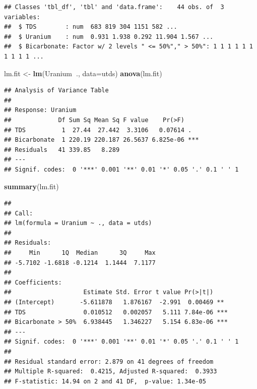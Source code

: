 \documentclass[]{book}
\newenvironment{Shaded}{\begin{snugshade}}{\end{snugshade}}
\newcommand{\CommentTok}[1]{\textcolor[rgb]{0.56,0.35,0.01}{\textit{#1}}}
\newcommand{\DataTypeTok}[1]{\textcolor[rgb]{0.13,0.29,0.53}{#1}}
\newcommand{\DecValTok}[1]{\textcolor[rgb]{0.00,0.00,0.81}{#1}}
\newcommand{\KeywordTok}[1]{\textcolor[rgb]{0.13,0.29,0.53}{\textbf{#1}}}
\newcommand{\NormalTok}[1]{#1}
\newcommand{\OperatorTok}[1]{\textcolor[rgb]{0.81,0.36,0.00}{\textbf{#1}}}
\newcommand{\StringTok}[1]{\textcolor[rgb]{0.31,0.60,0.02}{#1}}
\theoremstyle{definition}
\theoremstyle{definition}
\theoremstyle{definition}
\theoremstyle{remark}
\begin{document}
\begin{Shaded}
\end{Shaded}

\begin{verbatim}
## Classes 'tbl_df', 'tbl' and 'data.frame':    44 obs. of  3 variables:
##  $ TDS        : num  683 819 304 1151 582 ...
##  $ Uranium    : num  0.931 1.938 0.292 11.904 1.567 ...
##  $ Bicarbonate: Factor w/ 2 levels " <= 50%"," > 50%": 1 1 1 1 1 1 1 1 1 1 ...
\end{verbatim}

\begin{Shaded}
\begin{Highlighting}[]
\NormalTok{lm.fit <-}\StringTok{ }\KeywordTok{lm}\NormalTok{(Uranium}\OperatorTok{~}\NormalTok{., }\DataTypeTok{data=}\NormalTok{utds)}
\KeywordTok{anova}\NormalTok{(lm.fit)}
\end{Highlighting}
\end{Shaded}

\begin{verbatim}
## Analysis of Variance Table
## 
## Response: Uranium
##             Df Sum Sq Mean Sq F value    Pr(>F)    
## TDS          1  27.44  27.442  3.3106   0.07614 .  
## Bicarbonate  1 220.19 220.187 26.5637 6.825e-06 ***
## Residuals   41 339.85   8.289                      
## ---
## Signif. codes:  0 '***' 0.001 '**' 0.01 '*' 0.05 '.' 0.1 ' ' 1
\end{verbatim}

\begin{Shaded}
\begin{Highlighting}[]
\KeywordTok{summary}\NormalTok{(lm.fit)}
\end{Highlighting}
\end{Shaded}

\begin{verbatim}
## 
## Call:
## lm(formula = Uranium ~ ., data = utds)
## 
## Residuals:
##     Min      1Q  Median      3Q     Max 
## -5.7102 -1.6818 -0.1214  1.1444  7.1177 
## 
## Coefficients:
##                    Estimate Std. Error t value Pr(>|t|)    
## (Intercept)       -5.611878   1.876167  -2.991  0.00469 ** 
## TDS                0.010512   0.002057   5.111 7.84e-06 ***
## Bicarbonate > 50%  6.938445   1.346227   5.154 6.83e-06 ***
## ---
## Signif. codes:  0 '***' 0.001 '**' 0.01 '*' 0.05 '.' 0.1 ' ' 1
## 
## Residual standard error: 2.879 on 41 degrees of freedom
## Multiple R-squared:  0.4215, Adjusted R-squared:  0.3933 
## F-statistic: 14.94 on 2 and 41 DF,  p-value: 1.34e-05
\end{verbatim}
\end{document}
